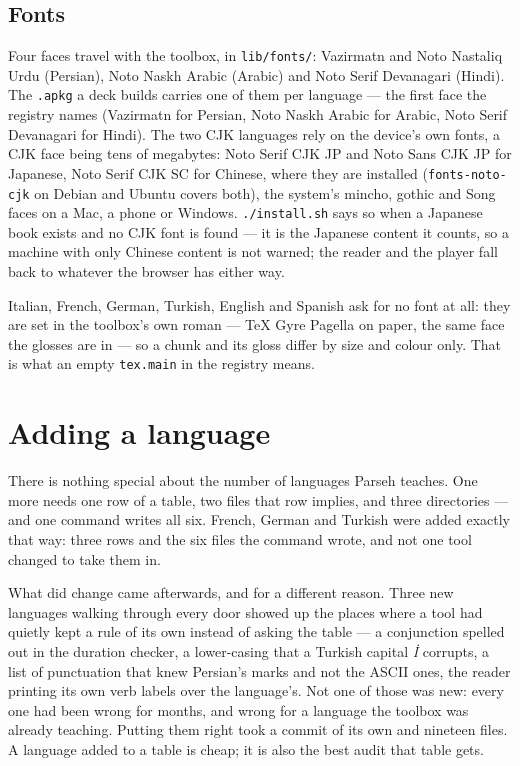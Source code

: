 \documentclass[11pt,oneside]{report}
\newcommand{\tw}[1]{\foreignlanguage{turkish}{\emph{#1}}}
\newcommand{\file}[1]{\texttt{#1}}
\begin{document}
\section{Fonts}

Four faces travel with the toolbox, in \file{lib/fonts/}: Vazirmatn and
Noto Nastaliq Urdu (Persian), Noto Naskh Arabic (Arabic) and Noto Serif
Devanagari (Hindi). The \file{.apkg} a deck builds carries one of them per
language --- the first face the registry names (Vazirmatn for Persian, Noto
Naskh Arabic for Arabic, Noto Serif Devanagari for Hindi). The two CJK
languages rely on the device's own fonts, a CJK face being tens of
megabytes: Noto Serif CJK JP and Noto Sans CJK JP for Japanese, Noto Serif
CJK SC for Chinese, where they are installed (\texttt{fonts-noto-cjk} on
Debian and Ubuntu covers both), the system's mincho, gothic and Song faces
on a Mac, a phone or Windows. \file{./install.sh} says so when a Japanese
book exists and no CJK font is found --- it is the Japanese content it
counts, so a machine with only Chinese content is not warned; the reader and
the player fall back to whatever the browser has either way.

Italian, French, German, Turkish, English and Spanish ask for no font at
all: they are set in the toolbox's own roman --- TeX Gyre Pagella on paper,
the same face the glosses are in --- so a chunk and its gloss differ by size
and colour only.
That is what an empty \texttt{tex.main} in the registry means.

\chapter{Adding a language}
\label{ch:addlang}

There is nothing special about the number of languages Parseh teaches. One
more needs one row of a table, two files that row implies, and three
directories --- and one command writes all six. French, German and Turkish
were added exactly that way: three rows and the six files the command wrote,
and not one tool changed to take them in.

What did change came afterwards, and for a different reason. Three new
languages walking through every door showed up the places where a tool had
quietly kept a rule of its own instead of asking the table --- a conjunction
spelled out in the duration checker, a lower-casing that a Turkish capital
\tw{İ} corrupts, a list of punctuation that knew Persian's marks and not the
ASCII ones, the reader printing its own verb labels over the language's. Not
one of those was new: every one had been wrong for months, and wrong for a
language the toolbox was already teaching. Putting them right took a commit
of its own and nineteen files. A language added to a table is cheap; it is
also the best audit that table gets.
\end{document}
